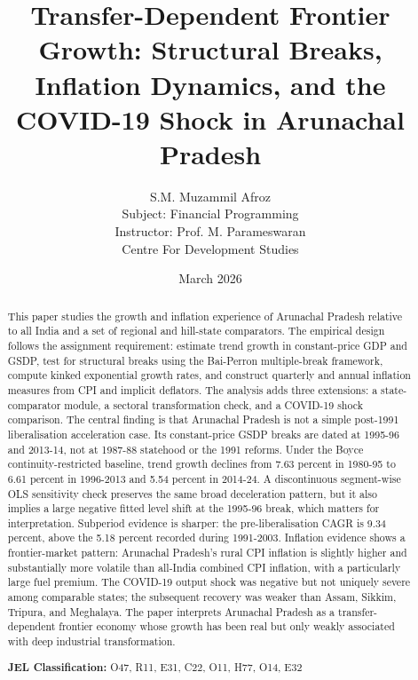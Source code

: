 \documentclass[11pt,a4paper]{article}
\begin{document}
\title{\textbf{Transfer-Dependent Frontier Growth: Structural Breaks, Inflation Dynamics, and the COVID-19 Shock in Arunachal Pradesh}}
\author{S.M. Muzammil Afroz\\
Subject: Financial Programming\\
Instructor: Prof. M. Parameswaran\\
Centre For Development Studies}
\date{March 2026}
\maketitle

\begin{abstract}
This paper studies the growth and inflation experience of Arunachal Pradesh relative to all India and a set of regional and hill-state comparators. The empirical design follows the assignment requirement: estimate trend growth in constant-price GDP and GSDP, test for structural breaks using the Bai-Perron multiple-break framework, compute kinked exponential growth rates, and construct quarterly and annual inflation measures from CPI and implicit deflators. The analysis adds three extensions: a state-comparator module, a sectoral transformation check, and a COVID-19 shock comparison. The central finding is that Arunachal Pradesh is not a simple post-1991 liberalisation acceleration case. Its constant-price GSDP breaks are dated at 1995-96 and 2013-14, not at 1987-88 statehood or the 1991 reforms. Under the Boyce continuity-restricted baseline, trend growth declines from 7.63 percent in 1980-95 to 6.61 percent in 1996-2013 and 5.54 percent in 2014-24. A discontinuous segment-wise OLS sensitivity check preserves the same broad deceleration pattern, but it also implies a large negative fitted level shift at the 1995-96 break, which matters for interpretation. Subperiod evidence is sharper: the pre-liberalisation CAGR is 9.34 percent, above the 5.18 percent recorded during 1991-2003. Inflation evidence shows a frontier-market pattern: Arunachal Pradesh's rural CPI inflation is slightly higher and substantially more volatile than all-India combined CPI inflation, with a particularly large fuel premium. The COVID-19 output shock was negative but not uniquely severe among comparable states; the subsequent recovery was weaker than Assam, Sikkim, Tripura, and Meghalaya. The paper interprets Arunachal Pradesh as a transfer-dependent frontier economy whose growth has been real but only weakly associated with deep industrial transformation.

\vspace{0.5cm}
\noindent \textbf{JEL Classification:} O47, R11, E31, C22, O11, H77, O14, E32
\end{abstract}
\end{document}
